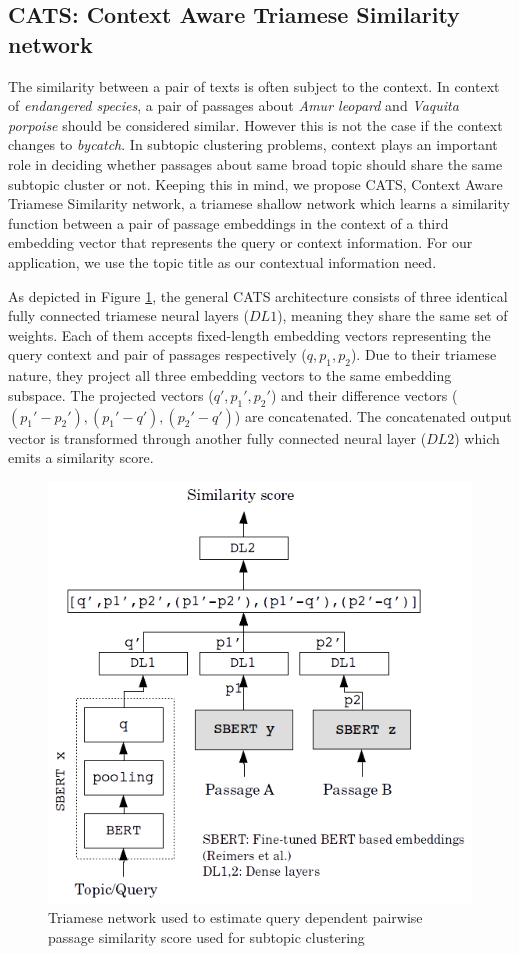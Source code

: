 \subsection{CATS: Context Aware Triamese Similarity network}\label{sec:cats} 
The similarity between a pair of texts is often subject to the context. In context of \textit{endangered species}, a pair of passages about \textit{Amur leopard} and \textit{Vaquita porpoise} should be considered similar. However this is not the case if the context changes to \textit{bycatch}. In subtopic clustering problems, context plays an important role in deciding whether passages about same broad topic should share the same subtopic cluster or not. Keeping this in mind, we propose CATS, Context Aware Triamese Similarity network, a triamese shallow network which learns a similarity function between a pair of passage embeddings in the context of a third embedding vector that represents the query or context information. For our application, we use the topic title as our contextual information need.

As depicted in Figure \ref{fig:triam}, the general CATS architecture consists of three identical fully connected triamese neural layers ($DL1$), meaning they share the same set of weights. Each of them accepts fixed-length embedding vectors representing the query context and pair of passages respectively ($q,p_1,p_2$). Due to their triamese nature, they project all three embedding vectors to the same embedding subspace. The projected vectors ($q',p_1',p_2'$) and their difference vectors ($(p_1'-p_2'),(p_1'-q'),(p_2'-q')$) are concatenated. The concatenated output vector is transformed through another fully connected neural layer ($DL2$) which emits a similarity score.
\begin{figure}[h]
  \centering
  \includegraphics[width=\linewidth]{graphics/triamese.png}
  \caption{Triamese network used to estimate query dependent pairwise passage similarity score used for subtopic clustering}
  \label{fig:triam}
\end{figure}

